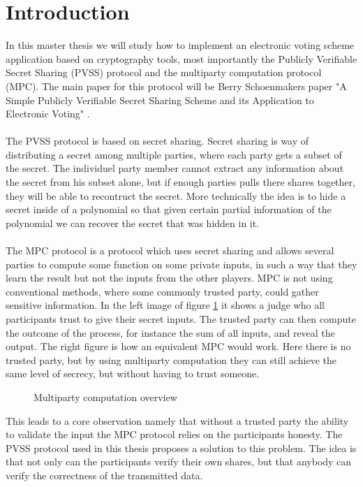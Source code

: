 \section{Introduction}
In this master thesis we will study how to implement an  electronic voting scheme application based on cryptography tools, most importantly the Publicly Verifiable Secret Sharing (PVSS) protocol and the multiparty computation protocol (MPC). The main paper for this protocol will be Berry Schoenmakers paper "A Simple Publicly Verifiable Secret Sharing Scheme and its Application to Electronic Voting" \cite{Schoenmakers1999}. \\\\
\noindent
The PVSS protocol is based on secret sharing. Secret sharing is way
of distributing a secret among multiple parties, where each party gets a subset of the secret. The individuel party member cannot extract any information about the secret from his subset alone, but if enough parties pulls there shares together, they will be able to recontruct the secret. More technically the idea is to hide a secret inside of a polynomial so that given certain partial information of the polynomial we can recover the secret that was hidden in it.\\\\
\noindent
The MPC protocol is a protocol which uses secret sharing and allows several parties to compute some function on some private inputs, in such a way that they learn the result but not the inputs from the other players. MPC is not using conventional methods, where some commonly trusted party, could gather sensitive information. In the left image of figure \ref{fig:MPC_Overview} it shows a judge who all participants trust to give their secret inputs. The trusted party can then compute the outcome of the process, for instance the sum of all inputs, and reveal the output. The right figure is how an equivalent MPC would work. Here there is no trusted party, but by using multiparty computation they can still achieve the same level of secrecy, but without having to trust someone.

\begin{figure}[H]
    \centering
    \caption{Multiparty computation overview}
    \label{fig:MPC_Overview}
\end{figure} 

\noindent
This leads to a core observation namely that without a trusted party the ability to validate the input the MPC protocol relies on the participants honesty. 
The PVSS protocol used in this thesis proposes a solution to this problem. The idea is that not only can the participants verify their own shares, but that anybody can verify the correctness of the transmitted data.